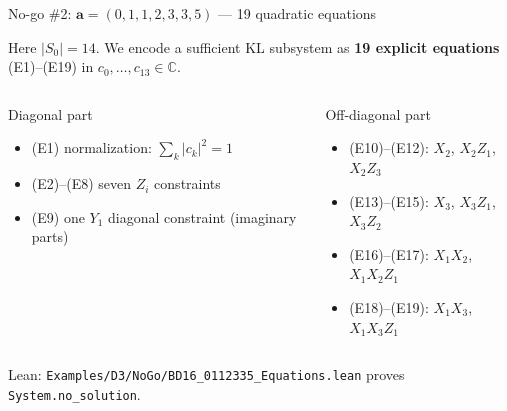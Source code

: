 \documentclass[aspectratio=169,t,10pt]{beamer}
\newcommand{\CC}{\mathbb{C}}
\newcommand{\code}[1]{\texttt{\small #1}}
\begin{document}
\begin{frame}{No-go \#2: $\mathbf{a}=(0,1,1,2,3,3,5)$ --- 19 quadratic equations}

Here $|S_0|=14$. We encode a sufficient KL subsystem as \textbf{19 explicit equations}
(E1)--(E19) in $c_0,\dots,c_{13}\in\CC$.

\begin{columns}[T]
\begin{block}{Diagonal part}
\begin{itemize}\setlength\itemsep{2pt}
\item (E1) normalization: $\sum_k |c_k|^2 = 1$
\item (E2)--(E8) seven $Z_i$ constraints
\item (E9) one $Y_1$ diagonal constraint (imaginary parts)
\end{itemize}
\end{block}

\begin{alertblock}{Off-diagonal part}
\begin{itemize}\setlength\itemsep{2pt}
\item (E10)--(E12): $X_2$, $X_2Z_1$, $X_2Z_3$
\item (E13)--(E15): $X_3$, $X_3Z_1$, $X_3Z_2$
\item (E16)--(E17): $X_1X_2$, $X_1X_2Z_1$
\item (E18)--(E19): $X_1X_3$, $X_1X_3Z_1$
\end{itemize}
\end{alertblock}
\end{columns}

\textcolor{Slate}{\small Lean: \code{Examples/D3/NoGo/BD16\_0112335\_Equations.lean} proves \code{System.no\_solution}.}
\end{frame}
\end{document}
